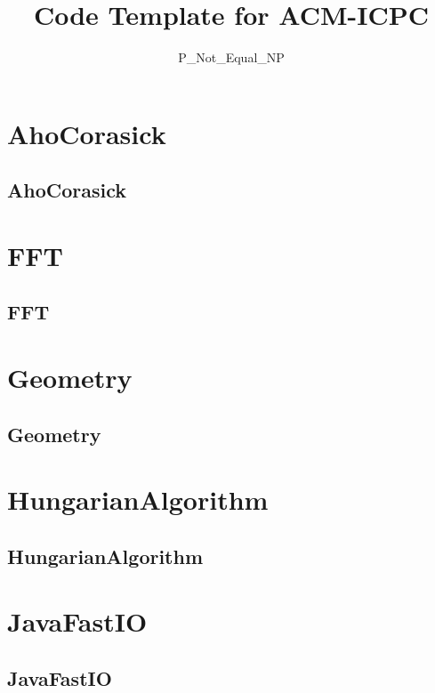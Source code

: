 \documentclass[a4paper, twocolumn]{article}
\title{Code Template for ACM-ICPC}
\author{P\_Not\_Equal\_NP}
\begin{document}
\begin{titlepage}
\maketitle
\thispagestyle{empty}
\pagebreak
\pagestyle{fancy}
\lhead{}
\rhead{}
\cfoot{}
\tableofcontents
\end{titlepage}

\pagestyle{fancy}
\cfoot{- \thepage \ -}
  
\section{AhoCorasick}
\subsection{AhoCorasick}

\section{FFT}
\subsection{FFT}

\section{Geometry}
\subsection{Geometry}

\section{HungarianAlgorithm}
\subsection{HungarianAlgorithm}

\section{JavaFastIO}
\subsection{JavaFastIO}

\end{document}
